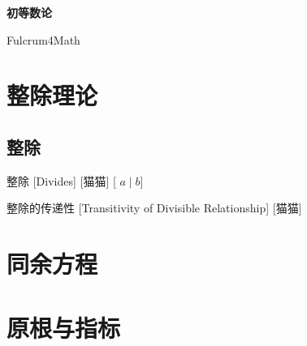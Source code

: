\documentclass[UTF8]{ctexart}
\begin{document}
\tableofcontents
\newpage

    \begin{center}
        {\LARGE\textbf{初等数论}}

        Fulcrum4Math
    \end{center}

    \section{整除理论}

        \subsection{整除}
            
            \begin{dfn}
                [Div]
                {整除}
                [Divides]
                [猫猫]
                    {\exists[\(n\)][\(b=an\)][\(\Z\)]}
                    [ \(a\mid b\)]
            \end{dfn}
            
            \begin{ppt}
                [DivTrans]
                {整除的传递性}
                [Transitivity of Divisible Relationship]
                [猫猫]
            \end{ppt}

        \section{同余方程}

        \section{原根与指标}
        
        
\end{document}
